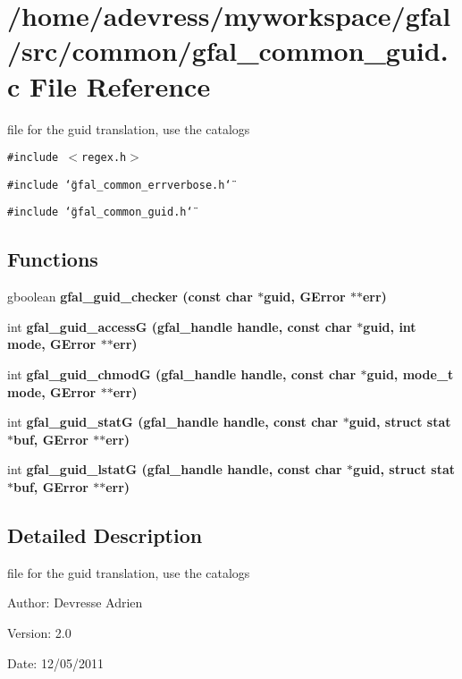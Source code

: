 \section{/home/adevress/myworkspace/gfal/src/common/gfal\_\-common\_\-guid.c File Reference}
\label{gfal__common__guid_8c}
file for the guid translation, use the catalogs 

{\tt \#include $<$regex.h$>$}\par
{\tt \#include \char`\"{}gfal\_\-common\_\-errverbose.h\char`\"{}}\par
{\tt \#include \char`\"{}gfal\_\-common\_\-guid.h\char`\"{}}\par
\subsection*{Functions}
\begin{CompactItemize}
\item 
gboolean \bf{gfal\_\-guid\_\-checker} (const char $\ast$guid, GError $\ast$$\ast$err)
\item 
int \bf{gfal\_\-guid\_\-access\-G} (gfal\_\-handle handle, const char $\ast$guid, int mode, GError $\ast$$\ast$err)
\item 
int \bf{gfal\_\-guid\_\-chmod\-G} (gfal\_\-handle handle, const char $\ast$guid, mode\_\-t mode, GError $\ast$$\ast$err)
\item 
int \bf{gfal\_\-guid\_\-stat\-G} (gfal\_\-handle handle, const char $\ast$guid, struct stat $\ast$buf, GError $\ast$$\ast$err)
\item 
int \bf{gfal\_\-guid\_\-lstat\-G} (gfal\_\-handle handle, const char $\ast$guid, struct stat $\ast$buf, GError $\ast$$\ast$err)
\end{CompactItemize}


\subsection{Detailed Description}
file for the guid translation, use the catalogs 

\begin{Desc}
\item[Author:]Devresse Adrien \end{Desc}
\begin{Desc}
\item[Version:]2.0 \end{Desc}
\begin{Desc}
\item[Date:]12/05/2011 \end{Desc}


